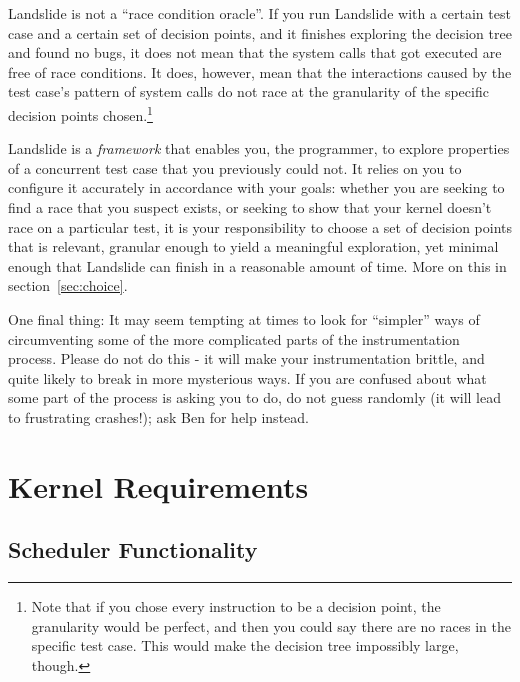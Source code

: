 \documentclass{article}
\begin{document}
Landslide is not a ``race condition oracle''. If you run Landslide with a certain test case and a certain set of decision points, and it finishes exploring the decision tree and found no bugs, it does not mean that the system calls that got executed are free of race conditions.
It does, however, mean that the interactions caused by the test case's pattern of system calls do not race at the granularity of the specific decision points chosen.\footnote{Note that if you chose every instruction to be a decision point, the granularity would be perfect, and then you could say there are no races in the specific test case. This would make the decision tree impossibly large, though.}

Landslide is a {\em framework} that enables you, the programmer, to explore properties of a concurrent test case that you previously could not. It relies on you to configure it accurately in accordance with your goals: whether you are seeking to find a race that you suspect exists, or seeking to show that your kernel doesn't race on a particular test, it is your responsibility to choose a set of decision points that is relevant, granular enough to yield a meaningful exploration, yet minimal enough that Landslide can finish in a reasonable amount of time. More on this in section~\ref{sec:choice}.

One final thing: It may seem tempting at times to look for ``simpler'' ways of circumventing some of the more complicated parts of the instrumentation process. Please do not do this - it will make your instrumentation brittle, and quite likely to break in more mysterious ways. If you are confused about what some part of the process is asking you to do, do not guess randomly (it will lead to frustrating crashes!); ask Ben for help instead.

\section{Kernel Requirements}
\label{sec:requirements}

\subsection{Scheduler Functionality}
\label{sec:schedfunc}
\end{document}
